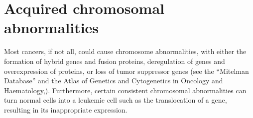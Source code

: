 \hypertarget{acquired-chromosomal-abnormalities}{%
\section{Acquired chromosomal abnormalities}\label{acquired-chromosomal-abnormalities}}

Most cancers, if not all, could cause chromosome abnormalities, with either the formation of hybrid genes and fusion proteins, deregulation of genes and overexpression of proteins, or loss of tumor suppressor genes (see the ``Mitelman Database'' and the Atlas of Genetics and Cytogenetics in Oncology and Haematology,). Furthermore, certain consistent chromosomal abnormalities can turn normal cells into a leukemic cell such as the translocation of a gene, resulting in its inappropriate expression.


